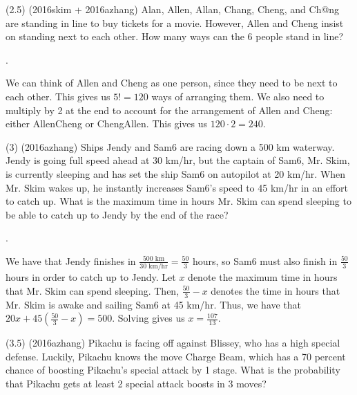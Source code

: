 \documentclass[11pt]{article}
\begin{document}
\begin{problem}
(2.5) (2016skim + 2016azhang) Alan, Allen, Allan, Chang, Cheng, and Ch@ng are standing in line to buy tickets for a movie. However, Allen and Cheng insist on standing next to each other. How many ways can the 6 people stand in line?
\end{problem}

\begin{answer}
.
\end{answer}

\begin{solution}
We can think of Allen and Cheng as one person, since they need to be next to each other. This gives us $5! = 120$ ways of arranging them. We also need to multiply by 2 at the end to account for the arrangement of Allen and Cheng: either AllenCheng or ChengAllen. This gives us $120\cdot2 = \boxed{240}$.
\end{solution}

\begin{problem}
(3) (2016azhang) Ships Jendy and Sam6 are racing down a 500 km waterway. Jendy is going full speed ahead at 30 km/hr, but the captain of Sam6, Mr. Skim, is currently sleeping and has set the ship Sam6 on autopilot at 20 km/hr. When Mr. Skim wakes up, he instantly increases Sam6's speed to 45 km/hr in an effort to catch up. What is the maximum time in hours Mr. Skim can spend sleeping to be able to catch up to Jendy by the end of the race?
\end{problem}

\begin{answer}
.
\end{answer}

\begin{solution}
We have that Jendy finishes in $\frac{500 \text{ km}}{30 \text{ km/hr}} = \frac{50}{3}$ hours, so Sam6 must also finish in $\frac{50}{3}$ hours in order to catch up to Jendy. Let $x$ denote the maximum time in hours that Mr. Skim can spend sleeping. Then, $\frac{50}{3} - x$ denotes the time in hours that Mr. Skim is awake and sailing Sam6 at 45 km/hr. Thus, we have that $20x + 45(\frac{50}{3}-x) = 500$. Solving gives us $x = \boxed{\frac{107}{13}}$.
\end{solution}

\begin{problem}
(3.5) (2016azhang) Pikachu is facing off against Blissey, who has a high special defense. Luckily, Pikachu knows the move Charge Beam, which has a 70 percent chance of boosting Pikachu's special attack by 1 stage. What is the probability that Pikachu gets at least 2 special attack boosts in 3 moves?
\end{problem}
\end{document}
